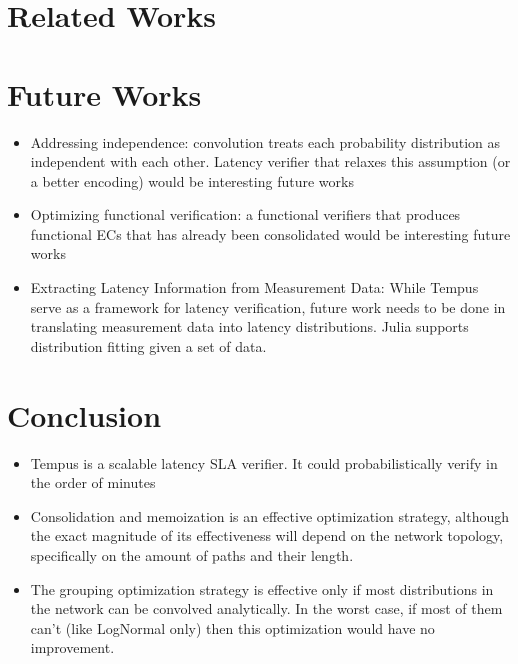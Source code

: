 \documentclass[10pt,sigconf,letterpaper,anonymous,nonacm]{acmart}
\begin{document}
\section{Related Works}

\section{Future Works}
\begin{itemize}
    \item Addressing independence: convolution treats each probability distribution as independent 
        with each other. Latency verifier that relaxes this assumption (or a better encoding) would be 
        interesting future works
    \item Optimizing functional verification: a functional verifiers that produces functional ECs that 
        has already been consolidated would be interesting future works
    \item Extracting Latency Information from Measurement Data: While Tempus serve as a framework for 
        latency verification, future work needs to be done in translating measurement data into latency 
        distributions. Julia supports distribution fitting given a set of data. 
\end{itemize}

\section{Conclusion}
\begin{itemize}
    \item Tempus is a scalable latency SLA verifier. It could probabilistically verify in the order of minutes
    \item Consolidation and memoization is an effective optimization strategy, although the exact magnitude of 
        its effectiveness will depend on the network topology, specifically on the amount of paths and their 
        length.
    \item The grouping optimization strategy is effective only if most distributions in the network can be 
        convolved analytically. In the worst case, if most of them can't (like LogNormal only) then this 
        optimization would have no improvement.
\end{itemize}



\end{document}
